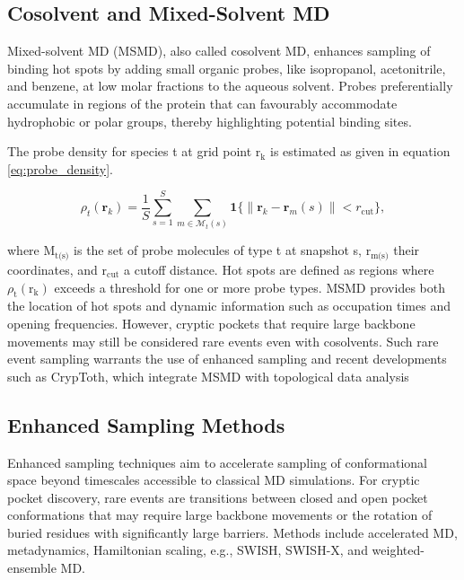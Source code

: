 \documentclass[12pt]{article}
\begin{document}
\subsection{Cosolvent and Mixed-Solvent MD}

Mixed-solvent MD (MSMD), also called cosolvent MD, enhances sampling of binding hot spots by adding small organic probes, like isopropanol, acetonitrile, and benzene, at low molar fractions to the aqueous solvent.\cite{CH5_Kuzmanic2020,CH5_Gasparikova2025} Probes preferentially accumulate in regions of the protein that can favourably accommodate hydrophobic or polar groups, thereby highlighting potential binding sites.

The probe density for species t at grid point $\textrm{r}_\textrm{k}$ is estimated as given in equation \ref{eq:probe_density}.

\begin{equation}
\rho_t(\mathbf{r}_k) = \frac{1}{S} \sum_{s=1}^{S} \sum_{m \in \mathcal{M}_t(s)} \mathbf{1}\{ \left\| \mathbf{r}_k - \mathbf{r}_{m}(s) \right\| < r_{\mathrm{cut}}\},
\label{eq:probe_density}
\end{equation}

where $\textrm{M}_\textrm{t(s)}$ is the set of probe molecules of type t at snapshot s, $\textrm{r}_\textrm{m(s)}$ their coordinates, and $\textrm{r}_{\textrm{cut}}$ a cutoff distance. Hot spots are defined as regions where $\rho_\textrm{t}(\textrm{r}_\textrm{k})$ exceeds a threshold for one or more probe types. MSMD provides both the location of hot spots and dynamic information such as occupation times and opening frequencies. However, cryptic pockets that require large backbone movements may still be considered rare events even with cosolvents. Such rare event sampling warrants the use of enhanced sampling and recent developments such as CrypToth, which integrate MSMD with topological data analysis\cite{CH5_koseki2025cryptoth,CH5_Gasparikova2025}


\subsection{Enhanced Sampling Methods}

Enhanced sampling techniques aim to accelerate sampling of conformational space beyond timescales accessible to classical MD simulations. For cryptic pocket discovery, rare events are transitions between closed and open pocket conformations that may require large backbone movements or the rotation of buried residues with significantly large barriers. Methods include accelerated MD, metadynamics, Hamiltonian scaling, e.g., SWISH\cite{CH5_comitani2018exploring}, SWISH-X\cite{CH5_Borsatto2024SWISHX}, and weighted-ensemble MD\cite{CH5_Kuzmanic2020,CH5_zhang2026decrypting}.
\end{document}
